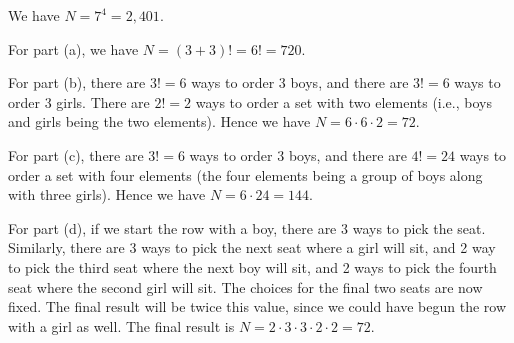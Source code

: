 \documentclass[a4paper,12pt]{article}
\begin{document}
\vspace{2mm}
We have $N = 7^4 = 2,401$.

\vspace{4mm}

\vspace{2mm}
For part (a), we have $N = (3+3)! = 6! = 720$.

\vspace{2mm}
For part (b), there are $3!=6$ ways to order 3 boys, and there are $3!=6$ ways to order 3 girls. There are $2! = 2$ ways to order a set with two elements (i.e., boys and girls being the two elements). Hence we have $N = 6 \cdot 6 \cdot 2 = 72$.

\vspace{2mm}
For part (c), there are $3!=6$ ways to order 3 boys, and there are $4!=24$ ways to order a set with four elements (the four elements being a group of boys along with three girls). Hence we have $N = 6 \cdot 24 = 144$.

\vspace{2mm}
For part (d), if we start the row with a boy, there are 3 ways to pick the seat. Similarly, there are 3 ways to pick the next seat where a girl will sit, and 2 way to pick the third seat where the next boy will sit, and 2 ways to pick the fourth seat where the second girl will sit. The choices for the final two seats are now fixed. The final result will be twice this value, since we could have begun the row with a girl as well. The final result is $N = 2 \cdot 3 \cdot 3 \cdot 2 \cdot 2 = 72$.

\pagebreak
{}
\end{document}
